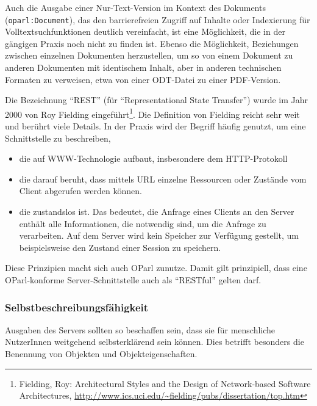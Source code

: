 \documentclass[,a4paper]{article}
\begin{document}
Auch die Ausgabe einer Nur-Text-Version im Kontext des Dokuments
(\texttt{oparl:Document}), das den barrierefreien Zugriff auf Inhalte
oder Indexierung für Volltextsuchfunktionen deutlich vereinfacht, ist
eine Möglichkeit, die in der gängigen Praxis noch nicht zu finden ist.
Ebenso die Möglichkeit, Beziehungen zwischen einzelnen Dokumenten
herzustellen, um so von einem Dokument zu anderen Dokumenten mit
identischem Inhalt, aber in anderen technischen Formaten zu verweisen,
etwa von einer ODT-Datei zu einer PDF-Version.


Die Bezeichnung ``REST'' (für ``Representational State Transfer'') wurde
im Jahr 2000 von Roy Fielding eingeführt\footnote{Fielding, Roy:
  Architectural Styles and the Design of Network-based Software
  Architectures,
  \url{http://www.ics.uci.edu/~fielding/pubs/dissertation/top.htm}}. Die
Definition von Fielding reicht sehr weit und berührt viele Details. In
der Praxis wird der Begriff häufig genutzt, um eine Schnittstelle zu
beschreiben,

\begin{itemize}
\itemsep1pt\parskip0pt
\item
  die auf WWW-Technologie aufbaut, insbesondere dem HTTP-Protokoll
\item
  die darauf beruht, dass mittels URL einzelne Ressourcen oder Zustände
  vom Client abgerufen werden können.
\item
  die zustandslos ist. Das bedeutet, die Anfrage eines Clients an den
  Server enthält alle Informationen, die notwendig sind, um die Anfrage
  zu verarbeiten. Auf dem Server wird kein Speicher zur Verfügung
  gestellt, um beispielsweise den Zustand einer Session zu speichern.
\end{itemize}

Diese Prinzipien macht sich auch OParl zunutze. Damit gilt prinzipiell,
dass eine OParl-konforme Server-Schnittstelle auch als ``RESTful''
gelten darf.

\subsubsection{Selbstbeschreibungsfähigkeit}\label{selbstbeschreibungsfuxe4higkeit}

Ausgaben des Servers sollten so beschaffen sein, dass sie für
menschliche NutzerInnen weitgehend selbsterklärend sein können. Dies
betrifft besonders die Benennung von Objekten und Objekteigenschaften.
\end{document}
